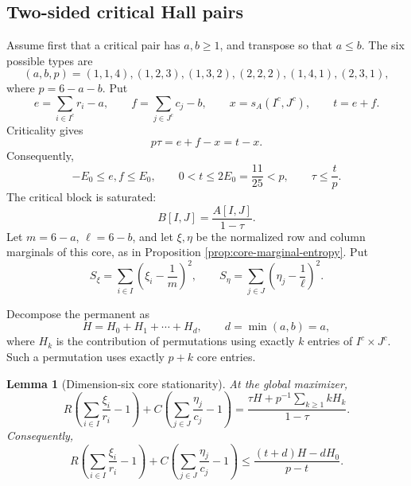 \documentclass[11pt]{article}
\newtheorem{lemma}[theorem]{Lemma}
\theoremstyle{definition}
\newcommand{\1}{\mathbf{1}}
\begin{document}
\subsection{Two-sided critical Hall pairs}

Assume first that a critical pair has $a,b\ge1$, and transpose so that
$a\le b$.  The six possible types are
\begin{equation}\label{eq:n6-types}
 (a,b,p)=(1,1,4),(1,2,3),(1,3,2),(2,2,2),(1,4,1),(2,3,1),
\end{equation}
where $p=6-a-b$.  Put
\begin{equation}\label{eq:n6-eftx}
 e=\sum_{i\in I^c}r_i-a,
 \qquad
 f=\sum_{j\in J^c}c_j-b,
 \qquad
 x=s_A(I^c,J^c),
 \qquad
 t=e+f.
\end{equation}
Criticality gives
\begin{equation}\label{eq:n6-tau-eft}
 p\tau=e+f-x=t-x.
\end{equation}
Consequently,
\begin{equation}\label{eq:n6-two-sided-domain}
 -E_0\le e,f\le E_0,
 \qquad
 0<t\le2E_0=\frac{11}{25}<p,
 \qquad
 \tau\le\frac tp.
\end{equation}
The critical block is saturated:
\[
 B[I,J]=\frac{A[I,J]}{1-\tau}.
\]
Let $m=6-a$, $\ell=6-b$, and let $\xi,\eta$ be the normalized row and
column marginals of this core, as in Proposition
\ref{prop:core-marginal-entropy}.  Put
\begin{equation}\label{eq:n6-Sxi}
 S_\xi=\sum_{i\in I}\left(\xi_i-\frac1m\right)^2,
 \qquad
 S_\eta=\sum_{j\in J}\left(\eta_j-\frac1\ell\right)^2.
\end{equation}

Decompose the permanent as
\[
 H=H_0+H_1+\cdots+H_d,
 \qquad d=\min(a,b)=a,
\]
where $H_k$ is the contribution of permutations using exactly $k$ entries
of $I^c\times J^c$.  Such a permutation uses exactly $p+k$ core entries.

\begin{lemma}[Dimension-six core stationarity]\label{lem:n6-core-stationarity}
At the global maximizer,
\begin{equation}\label{eq:n6-core-stationarity}
 R\left(\sum_{i\in I}\frac{\xi_i}{r_i}-1\right)
 +C\left(\sum_{j\in J}\frac{\eta_j}{c_j}-1\right)
 =\frac{\tau H+p^{-1}\sum_{k\ge1}kH_k}{1-\tau}.
\end{equation}
Consequently,
\begin{equation}\label{eq:n6-stationarity-upper}
 R\left(\sum_{i\in I}\frac{\xi_i}{r_i}-1\right)
 +C\left(\sum_{j\in J}\frac{\eta_j}{c_j}-1\right)
 \le\frac{(t+d)H-dH_0}{p-t}.
\end{equation}
\end{lemma}
\end{document}
